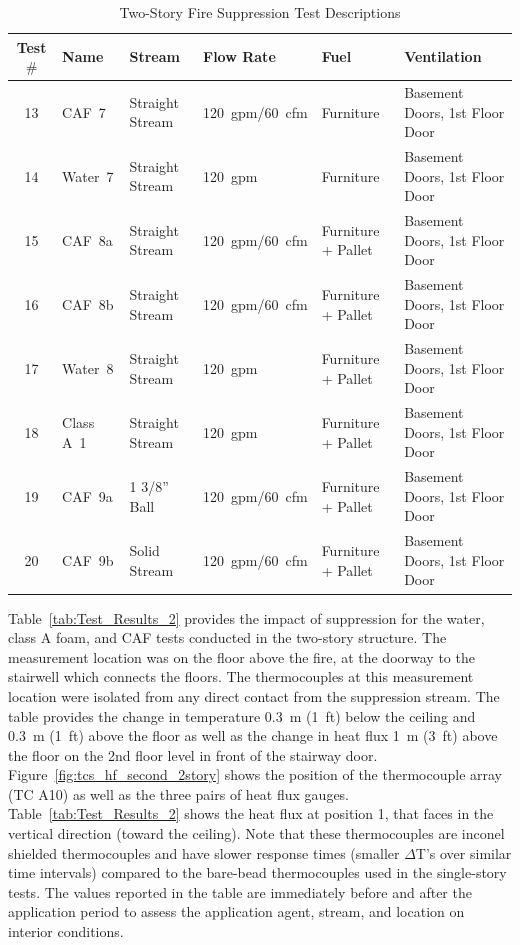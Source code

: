 \documentclass[12pt,oneside]{book}
\begin{document}
\begin{table}[!ht]
\centering
\footnotesize
\caption{Two-Story Fire Suppression Test Descriptions}\label{tab:Test_Descriptions_2}
\begin{tabular}{clllll}
\toprule[1.5pt]
Test $\#$  & Name	& Stream			& Flow Rate		& Fuel                    & Ventilation  \\
\midrule
 13  & CAF~7     &  Straight Stream  	&  120~gpm/60~cfm   & Furniture           & Basement Doors, 1st Floor Door \\
 14  & Water~7   &  Straight Stream  	&  120~gpm    		& Furniture           & Basement Doors, 1st Floor Door \\
 15  & CAF~8a    &  Straight Stream  	&  120~gpm/60~cfm   & Furniture + Pallet  & Basement Doors, 1st Floor Door \\
 16  & CAF~8b    &  Straight Stream  	&  120~gpm/60~cfm   & Furniture + Pallet  & Basement Doors, 1st Floor Door \\
 17  & Water~8   &  Straight Stream     &  120~gpm          & Furniture + Pallet  & Basement Doors, 1st Floor Door \\
 18  & Class A~1 &  Straight Stream  	&  120~gpm		    & Furniture + Pallet  & Basement Doors, 1st Floor Door \\
 19  & CAF~9a    &  1 3/8'' Ball    	&  120~gpm/60~cfm   & Furniture + Pallet  & Basement Doors, 1st Floor Door \\
 20  & CAF~9b    &  Solid Stream        &  120~gpm/60~cfm   & Furniture + Pallet  & Basement Doors, 1st Floor Door \\
\bottomrule[1.25pt]
\end{tabular}\par
\end{table}
  
Table~\ref{tab:Test_Results_2} provides the impact of suppression for the water, class A foam, and CAF tests conducted in the two-story structure. The measurement location was on the floor above the fire, at the doorway to the stairwell which connects the floors. The thermocouples at this measurement location were isolated from any direct contact from the suppression stream. The table provides the change in temperature 0.3~m (1~ft) below the ceiling and 0.3~m (1~ft) above the floor as well as the change in heat flux 1~m (3~ft) above the floor on the 2nd floor level in front of the stairway door. Figure~\ref{fig:tcs_hf_second_2story} shows the position of the thermocouple array (TC A10) as well as the three pairs of heat flux gauges. Table~\ref{tab:Test_Results_2} shows the heat flux at position 1, that faces in the vertical direction (toward the ceiling). Note that these thermocouples are inconel shielded thermocouples and have slower response times (smaller $\Delta$T's over similar time intervals) compared to the bare-bead thermocouples used in the single-story tests. The values reported in the table are immediately before and after the application period to assess the application agent, stream, and location on interior conditions.
\end{document}
